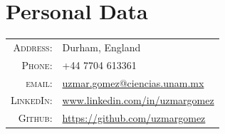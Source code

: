 \documentclass[a4paper,10pt]{article} %
\begin{document}
\bigskip
\section{Personal Data}
\bigskip
\begin{tabular}{rl}
\textsc{Address:} & Durham, England \\
\textsc{Phone:} & +44 7704 613361\\
\textsc{email:} & \href{mailto:uzmar.gomez@ciencias.unam.mx}{uzmar.gomez@ciencias.unam.mx}\\
\textsc{LinkedIn:} & \href{www.linkedin.com}{www.linkedin.com/in/uzmargomez}\\
\textsc{Github:} & \href{https://github.com/uzmargomez}{https://github.com/uzmargomez}%
\end{tabular}

\bigskip
\end{document}
